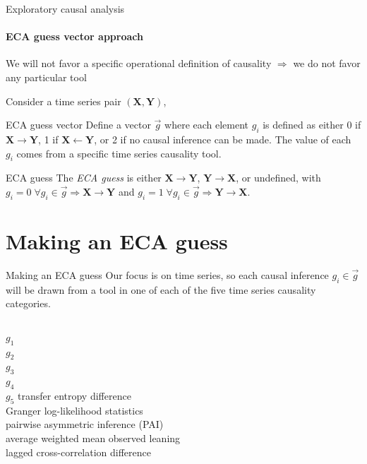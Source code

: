 \documentclass{beamer}
\begin{document}
\begin{frame}{Exploratory causal analysis}
\framesubtitle{ECA guess vector approach}

We will not favor a specific operational definition of causality $\Rightarrow$ we do not favor any particular tool

\vspace{0.25in}
Consider a time series pair $(\mathbf{X},\mathbf{Y})$,
\pause

\begin{block}{ECA guess vector}
Define a vector $\vec{g}$ where each element $g_i$ is defined as either 0 if $\mathbf{X}\rightarrow\mathbf{Y}$, 1 if $\mathbf{X}\leftarrow\mathbf{Y}$, or 2 if no causal inference can be made.  The value of each $g_i$ comes from a specific time series causality tool.
\end{block}
\pause
\begin{block}{ECA guess }
The {\em ECA guess} is either $\mathbf{X}\rightarrow\mathbf{Y}$, $\mathbf{Y}\rightarrow\mathbf{X}$, or undefined, with $g_i = 0\;\forall g_i\in\vec{g}\Rightarrow\mathbf{X}\rightarrow\mathbf{Y}$ and $g_i = 1\;\forall g_i\in\vec{g}\Rightarrow\mathbf{Y}\rightarrow\mathbf{X}$.
\end{block}
\end{frame}

\section{Making an ECA guess}
\begin{frame}{Making an ECA guess}
Our focus is on time series, so each causal inference $g_i\in \vec{g}$ will be drawn from a tool in one of each of the five time series causality categories.

\pause

\vspace{0.25in}
\begin{columns}
\hfill $g_1$\\
\hfill $g_2$\\
\hfill $g_3$\\
\hfill $g_4$\\
\hfill $g_5$
\alert<3->{transfer entropy difference} \\
\alert<4->{Granger log-likelihood statistics} \\
\alert<5->{pairwise asymmetric inference (PAI)} \\
\alert<6->{average weighted mean observed leaning} \\
\alert<7->{lagged cross-correlation difference} 
\end{columns}
\end{frame}
\end{document}
